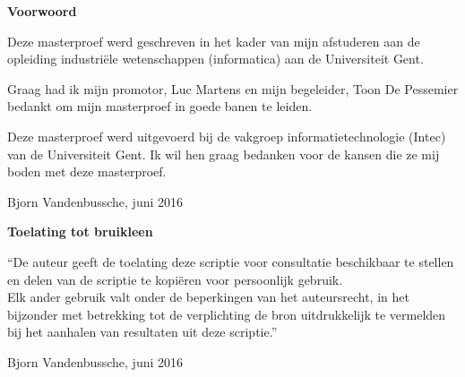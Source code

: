 
\newpage

\noindent \textbf{\huge Voorwoord}

\vspace{1.5cm}

\noindent
Deze masterproef werd geschreven in het kader van mijn afstuderen aan de opleiding industri\"ele wetenschappen (informatica) aan de Universiteit Gent. 

\noindent
Graag had ik mijn promotor, Luc Martens en mijn begeleider, Toon De Pessemier bedankt om mijn masterproef in goede banen te leiden. 

\noindent
Deze masterproef werd uitgevoerd bij de vakgroep informatietechnologie (Intec) van de Universiteit Gent. Ik wil hen graag bedanken voor de kansen die ze mij boden met deze masterproef. 


\addvspace{4cm}

\noindent Bjorn Vandenbussche, juni 2016\newpage

\noindent \textbf{\huge Toelating tot bruikleen}

\vspace{1.5cm}

\noindent
``De auteur geeft de toelating deze scriptie voor consultatie beschikbaar
te stellen en delen van de scriptie te kopi\"eren voor persoonlijk
gebruik.\\
Elk ander gebruik valt onder de beperkingen van het auteursrecht,
in het bijzonder met betrekking tot de verplichting de bron uitdrukkelijk
te vermelden bij het aanhalen van resultaten uit deze scriptie.''

\addvspace{4cm}

\noindent Bjorn Vandenbussche, juni 2016
